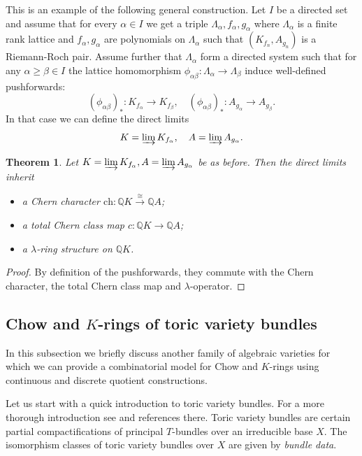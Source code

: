 \documentclass[oneside]{amsart}
\theoremstyle{plain}
\newtheorem{theorem}{Theorem}[section]
\theoremstyle{definition}
\newcommand{\Q}{{\mathbb{Q}}}
\newcommand{\ch}{{\mathrm{ch}}}
\begin{document}
This is an example of the following general construction. 
Let $I$ be a directed set and assume that for every $\alpha\in I$ we get a triple $\Lambda_\alpha, f_\alpha, g_\alpha$ where $\Lambda_\alpha$ is a finite rank lattice and $f_\alpha, g_\alpha$ are polynomials on $\Lambda_\alpha$ such that $(K_{f_n}, A_{g_n})$ is a Riemann-Roch pair. Assume further that $\Lambda_\alpha$ form a directed system such that for any $\alpha\geq\beta \in I$ the lattice homomorphism $\phi_{\alpha\beta}\colon \Lambda_\alpha \to \Lambda_\beta$ induce well-defined pushforwards:
\[
(\phi_{\alpha\beta})_*\colon K_{f_\alpha}\to K_{f_\beta},\quad (\phi_{\alpha\beta})_*
\colon A_{g_\alpha}\to A_{g_\beta}.
\]
In that case we can define the direct limits
\[
K = \varinjlim K_{f_\alpha},\quad A = \varinjlim A_{g_\alpha}.
\]
\begin{theorem}\label{thm:limit-lambda-chern}
  Let $K = \varinjlim K_{f_\alpha}, A = \varinjlim A_{g_\alpha}$  be as before. Then the direct limits inherit
  \begin{itemize}
      \item a Chern character $\ch: \Q K \xrightarrow{\cong} \Q A$;
      \item a total Chern class map $c: \Q K \to \Q A$;
      \item a $\lambda$-ring structure on $\Q K$.
  \end{itemize}
\end{theorem}
\begin{proof}
   By definition of the pushforwards, they commute with the Chern character, the total Chern class map and $\lambda$-operator. 
\end{proof}



\subsection{Chow and \texorpdfstring{$K$}{K}-rings of toric variety bundles}\label{sec:toric variety bundles}
In this subsection we briefly discuss another family of algebraic varieties for which we can provide a combinatorial model for Chow and $K$-rings using continuous and discrete quotient constructions.

Let us start with a quick introduction to toric variety bundles. For a more thorough introduction see \cite[Section 1]{carocci2026chow} and references there. Toric variety bundles are certain partial compactifications of principal $T$-bundles over an irreducible base $X$. The isomorphism classes of toric variety bundles over $X$ are given by \emph{bundle data}.
\end{document}
